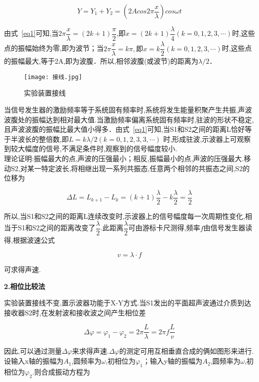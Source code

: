 \documentclass[12pt,a4paper,oneside,UTF8]{ctexart}
\begin{document}
\begin{equation}\label{eq1}
	Y=Y_1+Y_2=(2Acos2\pi \frac{x}{\lambda})cos\omega t 
\end{equation}

\noindent 由式~\ref{eq1}可知,当$ 2\pi \dfrac{x}{\lambda} =(2k+1) \dfrac{\pi}{2} $,即$x=(2k+1)\dfrac{\lambda}{4}(k=0,1,2,3,\cdots)$时,这些点的振幅始终为零,即为波节；当$ 2\pi \dfrac{x}{\lambda}=k\pi,即x=k\dfrac{\lambda}{2}(k=0,1,2,3,\cdots) $时,这些点的振幅最大,等于2A,即为波腹．所以,相邻波腹(或波节)的距离为$\lambda / 2$．

\begin{figure}[htpb]
	\centering
	\texttt{[image: 接线.jpg]}
	\caption{实验装置接线}
	\label{jiexian}
\end{figure}

当信号发生器的激励频率等于系统固有频率时,系统将发生能量积聚产生共振,声波波腹处的振幅达到相对最大值.当激励频率偏离系统固有频率时,驻波的形状不稳定,且声波波腹的振幅比最大值小得多．由式~\ref{eq1}可知,当S1和S2之间的距离L恰好等于半波长的整倍数,即$ L=k\lambda /2(k=0,1,2,3,3,\cdots) $ 时,形成驻波,示波器上可观察到较大幅度的信号,不满足条件时,观察到的信号幅度较小.\\

理论证明:振幅最大的点,声波的压强最小；相反,振幅最小的点,声波的压强最大.移动S2,对某一特定波长,将相继出现一系列共振态,任意两个相邻的共振态之间,S2的位移为

$$ \Delta L = L_{k+1} - L_{k} = (k+1)\dfrac{\lambda}{2} - k\dfrac{\lambda}{2} = \dfrac{\lambda}{2} $$ 

\noindent 所以,当S1和S2之间的距离L连续改变时,示波器上的信号幅度每一次周期性变化,相当于S1和S2之间的距离改变了$\dfrac{\lambda}{2}$.此距离$\dfrac{\lambda}{2}$可由游标卡尺测得,频率$f$由信号发生器读得,根据波速公式

$$ v = \lambda \cdot f $$

\noindent 可求得声速.

\textbf{2.相位比较法}

实验装置接线不变,置示波器功能于X-Y方式.当S1发出的平面超声波通过介质到达接收器S2时,在发射波和接收波之间产生相位差

$$ \Delta \varphi = \varphi_1 - \varphi_2 = 2\pi\dfrac{L}{\lambda} = 2\pi f \dfrac{L}{v} $$

\noindent 因此,可以通过测量$\Delta \varphi $来求得声速.$\Delta \varphi $的测定可用互相垂直合成的俩如图形来进行.设输入x轴的振幅为$A_1$,圆频率为$\omega$,初相位为$\varphi_1$；输入y轴的振幅为$A_2$,圆频率为$\omega$,初相位为$\varphi_2$.则合成振动方程为
\end{document}
